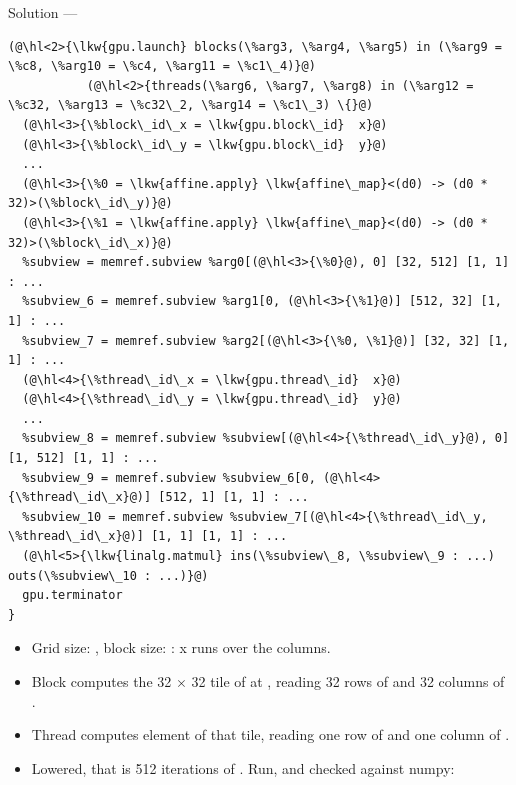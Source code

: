 \documentclass[aspectratio=169,10pt]{beamer}
\begin{document}
\begin{frame}[fragile]{Solution --- }
\begin{lstlisting}[language=mlir,basicstyle=\ttfamily\fontsize{6.1}{7.0}\selectfont]
(@\hl<2>{\lkw{gpu.launch} blocks(\%arg3, \%arg4, \%arg5) in (\%arg9 = \%c8, \%arg10 = \%c4, \%arg11 = \%c1\_4)}@)
           (@\hl<2>{threads(\%arg6, \%arg7, \%arg8) in (\%arg12 = \%c32, \%arg13 = \%c32\_2, \%arg14 = \%c1\_3) \{}@)
  (@\hl<3>{\%block\_id\_x = \lkw{gpu.block\_id}  x}@)
  (@\hl<3>{\%block\_id\_y = \lkw{gpu.block\_id}  y}@)
  ...
  (@\hl<3>{\%0 = \lkw{affine.apply} \lkw{affine\_map}<(d0) -> (d0 * 32)>(\%block\_id\_y)}@)
  (@\hl<3>{\%1 = \lkw{affine.apply} \lkw{affine\_map}<(d0) -> (d0 * 32)>(\%block\_id\_x)}@)
  %subview = memref.subview %arg0[(@\hl<3>{\%0}@), 0] [32, 512] [1, 1] : ...
  %subview_6 = memref.subview %arg1[0, (@\hl<3>{\%1}@)] [512, 32] [1, 1] : ...
  %subview_7 = memref.subview %arg2[(@\hl<3>{\%0, \%1}@)] [32, 32] [1, 1] : ...
  (@\hl<4>{\%thread\_id\_x = \lkw{gpu.thread\_id}  x}@)
  (@\hl<4>{\%thread\_id\_y = \lkw{gpu.thread\_id}  y}@)
  ...
  %subview_8 = memref.subview %subview[(@\hl<4>{\%thread\_id\_y}@), 0] [1, 512] [1, 1] : ...
  %subview_9 = memref.subview %subview_6[0, (@\hl<4>{\%thread\_id\_x}@)] [512, 1] [1, 1] : ...
  %subview_10 = memref.subview %subview_7[(@\hl<4>{\%thread\_id\_y, \%thread\_id\_x}@)] [1, 1] [1, 1] : ...
  (@\hl<5>{\lkw{linalg.matmul} ins(\%subview\_8, \%subview\_9 : ...) outs(\%subview\_10 : ...)}@)
  gpu.terminator
}
\end{lstlisting}
  \begin{itemize}
    \item<2-> Grid size: , block size: : x runs
      over the columns.
    \item<3-> Block  computes the 32 $\times$ 32 tile of 
      at , reading 32 rows of  and 32 columns
      of .
    \item<4-> Thread  computes element \cd{[ty, tx]} of that
      tile, reading one row of  and one column of .
    \item<5-> Lowered, that is 512 iterations of . Run, and checked
      against numpy: 
  \end{itemize}
\end{frame}
\end{document}
